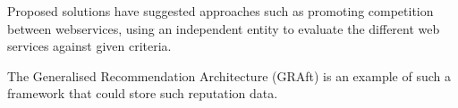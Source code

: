 Proposed solutions have suggested approaches such as promoting competition between webservices, using an independent entity to evaluate the different web services against given criteria. %

The Generalised Recommendation Architecture (GRAft) is an example of such a framework that could store such reputation data.




